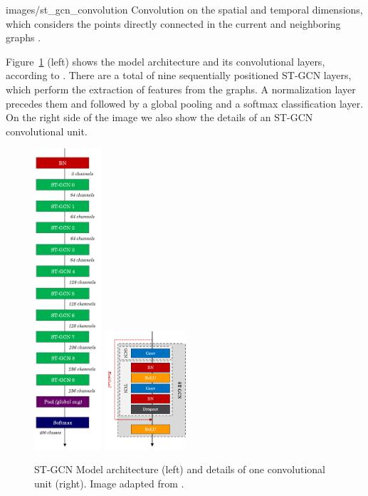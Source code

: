     {images/st_gcn_convolution}
    {Convolution on the spatial and temporal dimensions, which considers the points directly connected in the current and neighboring graphs \cite[p. 3]{st-gcn-2018}.}

Figure~\ref{fig:st-gcn-architecture} (left) shows the model architecture and its convolutional layers, according to \cite{st-gcn-2018}. There are a total of nine sequentially positioned ST-GCN layers, which perform the extraction of features from the graphs. A normalization layer precedes them and followed by a global pooling and a softmax classification layer. On the right side of the image we also show the details of an ST-GCN convolutional unit.

\begin{figure}[ht]
    \centering
    \includegraphics[width=2.5cm]{images/st_gcn_architecture}
    \includegraphics[width=3.0cm]{images/st_gcn_architeture_unit}
    \caption{ST-GCN Model architecture (left) and details of one convolutional unit (right). Image adapted from \cite{st-gcn-2018}.}
    \label{fig:st-gcn-architecture}
\end{figure}

